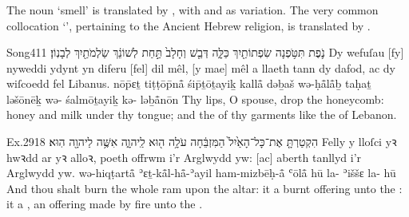 \subsubsection{}

\begin{paper}
	The noun  ‘smell’ is translated by , with  and  as variation. The very common collocation  ‘’, pertaining to the Ancient Hebrew religion, is translated by .
\end{paper}

\begin{example}{Song}{4}{11}
	\quoling
	{נֹ֛פֶת תִּטֹּ֥פְנָה שִׂפְתוֹתַ֖יִךְ כַּלָּ֑ה דְּבַ֤שׁ וְחָלָב֙ תַּ֣חַת לְשׁוֹנֵ֔ךְ  שַׂלְמֹתַ֖יִךְ  לְבָנֽוֹן׃}
	{Dy wefuſau [fy] nyweddi ydynt yn diferu [fel] dil mêl, [y mae] mêl a llaeth tann dy dafod, ac  dy wiſcoedd fel  Libanus.}
	{nōp̄ɛṯ tiṭṭōp̄nå̄ śip̄ṯōṯayiḵ kallå̄ dəḇaš wə-ḥå̄lå̄ḇ taḥaṯ ləšōnēḵ wə- śalmōṯayiḵ kə- ləḇå̄nōn}
	{Thy lips, O  spouse, drop  the honeycomb: honey and milk  under thy tongue; and the  of thy garments  like the  of Lebanon.}
\end{example}

\begin{example}{Ex.}{29}{18}{}{}
	\quoling
	{הִקְטַרְתָּ֤ אֶת־כָּל־הָאַ֙יִל֙ הַמִּזְבֵּ֔חָה עֹלָ֥ה ה֖וּא לַֽיהוָ֑ה  אִשֶּׁ֥ה לַיהוָ֖ה הֽוּא׃}
	{Felly y lloſci yꝛ hwꝛdd ar yꝛ alloꝛ, poeth offrwm i’r Arglwydd yw:  [ac] aberth tanllyd i’r Arglwydd yw.}
	{wə-hiqṭartå̄ ʾɛṯ-kå̄l-hå̄-ʾayil ham-mizbēḥ-å̄ ʿōlå̄ hū la-{\YHWH}  ʾiššɛ la-{\YHWH} hū}
	{And thou shalt burn the whole ram upon the altar: it  a burnt offering unto the {\LORD}: it  a , an offering made by fire unto the {\LORD}.}
\end{example}
